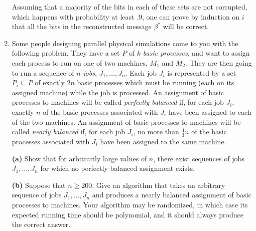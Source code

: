 \documentclass[12pt]{article}
\begin{document}
\begin{enumerate}
{Assuming that a majority of the bits in each of these sets
are not corrupted, which happens with probability at least $.9$,
one can prove by induction on $i$ that all the bits in
the reconstructed message $\beta^*$ will be correct.

}


\item 

Some people designing parallel physical simulations
come to you with the following problem.
They have a set $P$ of $k$ {\em basic processes}, and
want to assign each process to run on one of two machines,
$M_1$ and $M_2$.
They are then going to run a sequence of $n$ {\em jobs},
$J_1, \ldots, J_n$.
Each job $J_i$ is represented by a set $P_i \subseteq P$
of exactly $2n$ basic processes which must
be running (each on its assigned machine) while the job is processed.
An assignment of basic processes to machines will be
called {\em perfectly balanced} if, for each job $J_i$,
exactly $n$ of the basic processes associated
with $J_i$ have been assigned to each of the two machines.
An assignment of basic processes to machines will be
called {\em nearly balanced} if, for each job $J_i$,
no more than $\frac43 n$ of the basic processes associated
with $J_i$ have been assigned to the same machine.

{\bf (a)} Show that for arbitrarily large values of $n$,
there exist sequences of jobs $J_1, \ldots, J_n$
for which no perfectly balanced assignment exists.

{\bf (b)} Suppose that $n \geq 200$.
Give an algorithm that takes an arbitrary sequence
of jobs $J_1, \ldots, J_n$ and produces a nearly balanced
assignment of basic processes to machines.
Your algorithm may be randomized, in which case its
expected running time should be polynomial, and it
should always produce the correct answer.

\end{enumerate}
\end{document}
